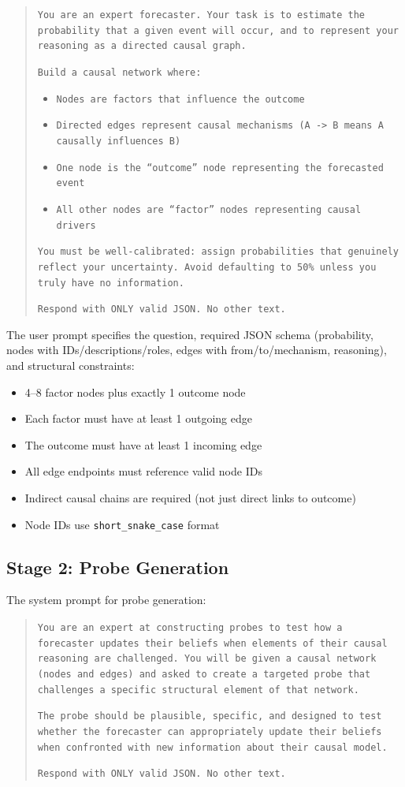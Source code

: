 \documentclass[11pt]{article}
\begin{document}
\begin{quote}
\small
\texttt{You are an expert forecaster. Your task is to estimate the probability that a given event will occur, and to represent your reasoning as a directed causal graph.}

\texttt{Build a causal network where:}
\begin{itemize}
\small
\item \texttt{Nodes are factors that influence the outcome}
\item \texttt{Directed edges represent causal mechanisms (A -> B means A causally influences B)}
\item \texttt{One node is the ``outcome'' node representing the forecasted event}
\item \texttt{All other nodes are ``factor'' nodes representing causal drivers}
\end{itemize}

\texttt{You must be well-calibrated: assign probabilities that genuinely reflect your uncertainty. Avoid defaulting to 50\% unless you truly have no information.}

\texttt{Respond with ONLY valid JSON. No other text.}
\end{quote}

The user prompt specifies the question, required JSON schema (probability, nodes with IDs/descriptions/roles, edges with from/to/mechanism, reasoning), and structural constraints:
\begin{itemize}
\small
\item 4--8 factor nodes plus exactly 1 outcome node
\item Each factor must have at least 1 outgoing edge
\item The outcome must have at least 1 incoming edge
\item All edge endpoints must reference valid node IDs
\item Indirect causal chains are required (not just direct links to outcome)
\item Node IDs use \texttt{short\_snake\_case} format
\end{itemize}

\subsection{Stage 2: Probe Generation}
\label{app:prompt-probe-gen}

The system prompt for probe generation:

\begin{quote}
\small
\texttt{You are an expert at constructing probes to test how a forecaster updates their beliefs when elements of their causal reasoning are challenged. You will be given a causal network (nodes and edges) and asked to create a targeted probe that challenges a specific structural element of that network.}

\texttt{The probe should be plausible, specific, and designed to test whether the forecaster can appropriately update their beliefs when confronted with new information about their causal model.}

\texttt{Respond with ONLY valid JSON. No other text.}
\end{quote}
\end{document}
